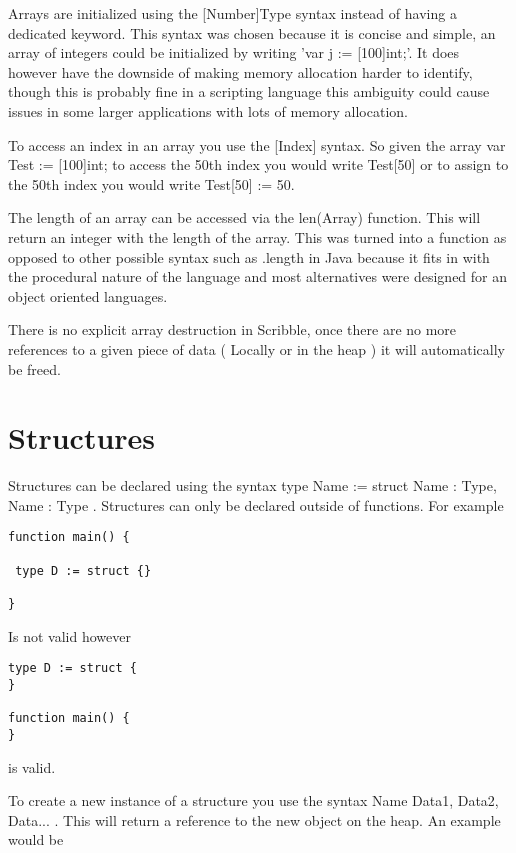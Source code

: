\documentclass[]{final_report}
\begin{document}
Arrays are initialized using the [Number]Type syntax instead of having a dedicated keyword. This syntax was chosen because it is concise and simple, an array of integers could be initialized by writing 'var j := [100]int;'. It does however have the downside of making memory allocation harder to identify, though this is probably fine in a scripting language this ambiguity could cause issues in some larger applications with lots of memory allocation.

To access an index in an array you use the [Index] syntax. So given the array var Test := [100]int; to access the 50th index you would write Test[50] or to assign to the 50th index you would write Test[50] := 50.

The length of an array can be accessed via the len(Array) function. This will return an integer with the length of the array. This was turned into a function as opposed to other possible syntax such as .length in Java because it fits in with the procedural nature of the language and most alternatives were designed for an object oriented languages.

There is no explicit array destruction in Scribble, once there are no more references to a given piece of data ( Locally or in the heap ) it will automatically be freed.

\section{Structures}

Structures can be declared using the syntax type Name := struct { Name : Type, Name : Type }. Structures can only be declared outside of functions. For example

\begin{verbatim}
function main() {

 type D := struct {}

}
\end{verbatim}

Is not valid however

\begin{verbatim}
type D := struct {
}

function main() {
}
\end{verbatim}

is valid.

To create a new instance of a structure you use the syntax Name{ Data1, Data2, Data... }. This will return a reference to the new object on the heap. An example would be
\end{document}
